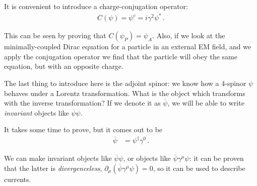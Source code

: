 \documentclass[main.tex]{subfiles}
\begin{document}
It is convenient to introduce a charge-conjugation operator: 
%
\begin{align}
C(\psi ) = \psi^{c} = i \gamma^{2} \psi^{*}
\,.
\end{align}

This can be seen by proving that \(C( \psi _P) = \psi _A\). 
Also, if we look at the minimally-coupled Dirac equation for a particle 
in an external EM field, and we apply the conjugation operator we find that 
the particle will obey the same equation, but with an opposite charge. 

The last thing to introduce here is the adjoint spinor: we know how a 4-spinor \(\psi \) behaves
under a Lorentz transformation. 
What is the object which transforms with the inverse transformation? If we denote it as \(\overline{\psi}\), 
we will be able to write \emph{invariant} objects like \(\overline{\psi}\psi  \). 

It takes some time to prove, but it comes out to be 
%
\begin{align}
\overline{\psi} &= \psi^{\dag} \gamma^{0}
\,.
\end{align}

We can make invariant objects like \(\overline{\psi} \psi\), 
or objects like \(\overline{\psi} \gamma^{\mu } \psi \): it can be proven that the latter is 
\emph{divergenceless}, \(\partial_{\mu } (\overline{\psi} \gamma^{\mu } \psi ) = 0\), so it can be used 
to describe currents.
\end{document}
